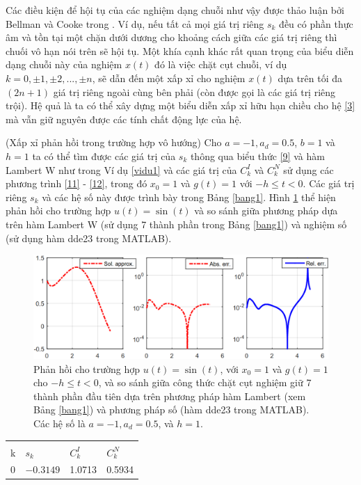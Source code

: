 Các điều kiện để hội tụ của các nghiệm dạng chuỗi như vậy được thảo luận bởi Bellman và Cooke trong \cite{BelC63}. Ví dụ, nếu tất cả mọi giá trị riêng $s_k$ đều có phần thực âm và tồn tại một chặn dưới dương cho khoảng cách giữa các giá trị riêng
thì chuối vô hạn nói trên sẽ hội tụ. 
%
Một khía cạnh khác rất quan trọng của biểu diễn dạng chuỗi này của nghiệm $x(t)$ đó là việc chặt cụt chuỗi, ví dụ $k=0,\pm 1,\pm 2,...,\pm n$, sẽ dẫn đến một xấp xỉ cho nghiệm $x(t)$ dựa trên tối đa $(2n + 1)$ giá trị riêng ngoài cùng bên phải (còn được gọi là các giá trị riêng trội). Hệ quả là ta có thể xây dựng một biểu diễn xấp xỉ hữu hạn chiều cho hệ \eqref{3} mà vẫn giữ nguyên được các tính chất động lực của hệ.   

\begin{vd}\label{vidu2} (Xấp xỉ phản hồi trong trường hợp vô hướng)
	Cho $a=-1, a_d=0.5$, $b=1$ và $h=1$ ta có thể tìm được các giá trị của $s_k$ thông qua biểu thức \eqref{9} và hàm Lambert W như trong Ví dụ \ref{vidu1} và các giá trị của $C^I_k$ và $C^N_k$ sử dụng các phương trình \eqref{11} - \eqref{12}, trong đó $x_0=1$ và $g(t)=1$ với $-h\leq t<0$. Các giá trị riêng $s_k$ và các hệ số này được trình bày trong Bảng \eqref{bang1}. Hình \ref{refhinh2} thể hiện phản hồi cho trường hợp $u(t)=\sin(t)$ và so sánh giữa phương pháp dựa trên hàm Lambert W (sử dụng 7 thành phần trong Bảng \eqref{bang1}) và nghiệm số (sử dụng hàm dde23 trong MATLAB). 
	\begin{figure}[ht]
		\begin{center}
			\includegraphics[scale=0.55]{hinh/hinh2}
		\end{center}
		\caption{Phản hồi cho trường hợp $u(t)=\sin(t)$, với $x_0=1$ và $g(t)=1$ cho $-h\leq t<0$, và so sánh giữa công thức chặt cụt nghiệm giữ 7 thành phần đầu tiên dựa trên phương pháp hàm Lambert (xem Bảng \eqref{bang1}) và phương pháp số (hàm dde23 trong MATLAB). Các hệ số là $a=-1, a_d=0.5$, và $h=1$.}
		\label{refhinh2}
	\end{figure}
	
	\begin{table}[ht]
		\centering	
		\begin{tabular}{llll}
			\hline \\[-.35cm]
			k & $s_k$ & $C^I_k$ & $C^N_k$ \\ 
			\hline 
			0 & $-0.3149$ & 1.0713 & 0.5934 \\ 
			

\end{tabular}
\end{table}
\end{vd}
